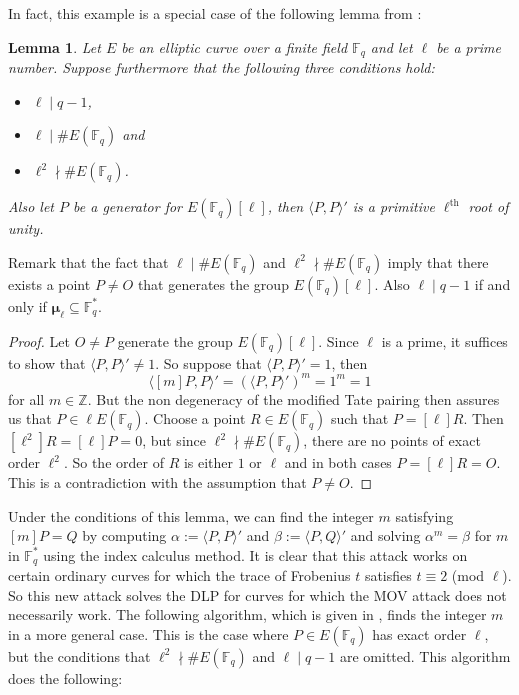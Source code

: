 \documentclass{article}
\numberwithin{equation}{section}
\newtheorem{lemma}[theorem]{Lemma}
\theoremstyle{definition}
\newcommand{\ZZ}{{\mathbb Z}} %
\newcommand{\FF}[1]{{\mathbb F}_{#1}} %
\newcommand{\rou}[1]{\boldsymbol{\mu}_{#1}} %
\begin{document}
In fact, this example is a special case of the following lemma from \cite{Washington}:

\begin{lemma}\label{freyrucktrivialcase}
Let $E$ be an elliptic curve over a finite field $\FF{q}$ and let $\ell$ be a prime number. Suppose furthermore that the following three conditions hold:
\begin{itemize}
\item $\ell \mid q-1$,
\item $\ell \mid \#E(\FF{q})$ and 
\item $\ell^2 \nmid \#E(\FF{q})$.
\end{itemize} 
Also let $P$ be a generator for $E(\FF{q})[\ell]$, then $\langle P,P \rangle '$ is a primitive $\ell^\text{th}$ root of unity.
\end{lemma}

Remark that the fact that $\ell \mid \#E(\FF{q})$ and $\ell^2 \nmid \#E(\FF{q})$ imply that there exists a point $P \neq O$ that generates the group $E(\FF{q})[\ell]$. Also $\ell \mid q-1$ if and only if $\rou{\ell} \subseteq \FF{q}^*$. 

\begin{proof}
Let $O \neq P$ generate the group $E(\FF{q})[\ell]$. Since $\ell$ is a prime, it suffices to show that $\langle P,P \rangle' \neq 1$. So suppose that $\langle P,P \rangle ' = 1$, then $$\langle [m]P,P \rangle ' = (\langle P,P \rangle ')^m=1^m=1$$ for all $m \in \ZZ.$ But the non degeneracy of the modified Tate pairing then assures us that $P \in \ell E(\FF{q})$. Choose a point $R \in E(\FF{q})$ such that $P=[\ell]R$. Then $[\ell^2]R=[\ell]P=0$, but since $\ell^2 \nmid \#E(\FF{q})$, there are no points of exact order $\ell^2$. So the order of $R$ is either $1$ or $\ell$ and in both cases $P=[\ell]R=O$. This is a contradiction with the assumption that $P \neq O$.
\end{proof}

Under the conditions of this lemma, we can find the integer $m$ satisfying $[m]P=Q$ by computing $\alpha:=\langle P,P \rangle'$ and $\beta:=\langle P,Q \rangle'$ and solving $\alpha^m=\beta$ for $m$ in $\FF{q}^*$ using the index calculus method. It is clear that this attack works on certain ordinary curves for which the trace of Frobenius $t$ satisfies $t \equiv 2$ (mod $\ell$). So this new attack solves the DLP for curves for which the MOV attack does not necessarily work. The following algorithm, which is given in \cite{freyrucksecond}, finds the integer $m$ in a more general case. This is the case where $P\in E(\FF{q})$ has exact order $\ell$, but the conditions that $\ell^2 \nmid \#E(\FF{q})$ and $\ell \mid q-1$ are omitted. This algorithm does the following:
\end{document}
